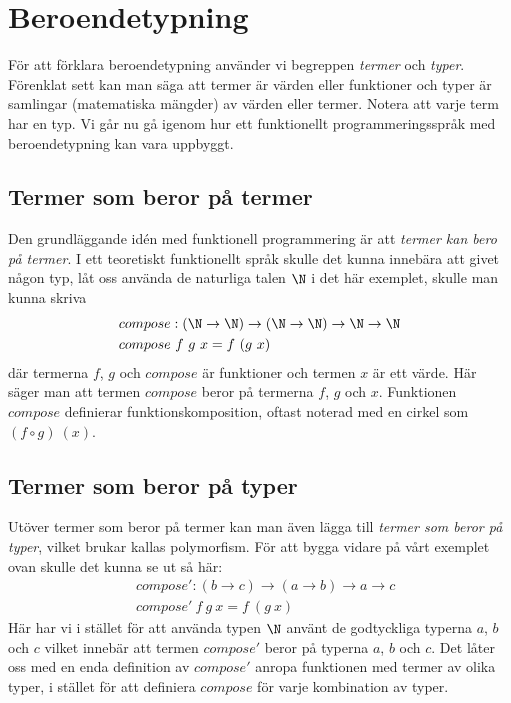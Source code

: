 \section{Beroendetypning}
För att förklara beroendetypning använder vi begreppen \emph{termer} och
\emph{typer}. Förenklat sett kan man säga att termer är värden eller funktioner
och typer är samlingar (matematiska mängder) av värden eller termer. Notera att
varje term har en typ. Vi går nu gå igenom hur ett funktionellt
programmeringsspråk med beroendetypning kan vara uppbyggt.

\subsection{Termer som beror på termer}
Den grundläggande idén med funktionell programmering är att \emph{termer kan
bero på termer}. I ett teoretiskt funktionellt språk skulle det kunna innebära
att givet någon typ, låt oss använda de naturliga talen $\N$ i det här
exemplet, skulle man kunna skriva
\begin{align*}
  &compose : (\N \to \N) \to (\N \to \N) \to \N \to \N \\
  &compose\ f\ g\ x = f\ (g\ x)
\end{align*}
där termerna $f$, $g$ och $compose$ är funktioner och termen $x$ är ett värde.
Här säger man att termen $compose$ beror på termerna $f$, $g$ och $x$.
Funktionen $compose$ definierar funktionskomposition, oftast noterad med en
cirkel som $(f \circ g)\ (x)$.


\subsection{Termer som beror på typer}
Utöver termer som beror på termer kan man även lägga till \emph{termer som
beror på typer}, vilket brukar kallas polymorfism. För att bygga vidare på vårt
exemplet ovan skulle det kunna se ut så här:
\begin{align*}
  &compose' : (b \to c) \to (a \to b) \to a \to c \\
  &compose'\ f\ g\ x = f\ (g\ x)
\end{align*}
Här har vi i stället för att använda typen $\N$ använt de godtyckliga typerna
$a$, $b$ och $c$ vilket innebär att termen $compose'$ beror på typerna $a$, $b$
och $c$. Det låter oss med en enda definition av $compose'$ anropa funktionen
med termer av olika typer, i stället för att definiera $compose$ för varje
kombination av typer.

